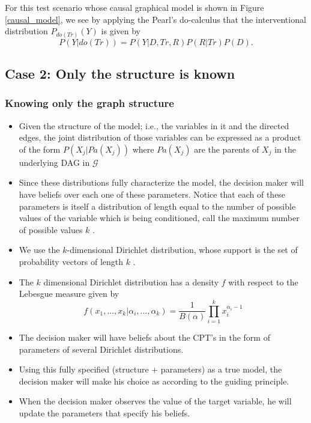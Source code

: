 \documentclass{beamer}
\theoremstyle{plain}
\begin{document}
\begin{frame}
For this test scenario whose causal graphical model is shown in Figure \ref{causal_model}, we see  by applying the Pearl's do-calculus that the interventional distribution $P_{do(Tr)}(Y)$ is given by
\[ P(Y | do(Tr))=P(Y | D, Tr, R)P(R | Tr) P(D). \]
\end{frame}

\subsection{Case 2: Only the structure is known}
\begin{frame}
\frametitle{Knowing only the graph structure}
\begin{itemize}
\item Given the structure of the model; i.e., the variables in it and the directed edges, the joint distribution of those variables can be expressed as a product of the form $P(X_j | Pa(X_j))$ where $Pa(X_j)$ are the parents of $X_j$ in the underlying DAG in $\mathcal{G}$
\item Since these distributions fully characterize the model, the decision maker will have beliefs over each one of these parameters. Notice that each of these parameters is itself a distribution of length equal to the number of possible values of the variable which is being conditioned, call the maximum number of possible values $k$ .
\end{itemize} 
\end{frame}

\begin{frame}
\begin{itemize}
\item We use the $k$-dimensional Dirichlet distribution, whose support is the set of probability vectors of length $k$ \cite{hjort2010bayesian}. 
\item The $k$ dimensional Dirichlet distribution has a density $f$ with respect to the Lebesgue measure given by
\[ f(x_1,...,x_k | \alpha_i,...,\alpha_k)=\frac{1}{B(\alpha)}  \prod_{i=1}^k x_i^{\alpha_i-1}\]
\item The decision maker will have beliefs about the CPT's in the form of parameters of several Dirichlet distributions.
\item Using this fully specified (structure + parameters) as a true model, the decision maker will make his choice as according to the guiding principle.
\item When the decision maker observes the value of the target variable, he will update the parameters that specify his beliefs.
\end{itemize}
\end{frame}
\end{document}
